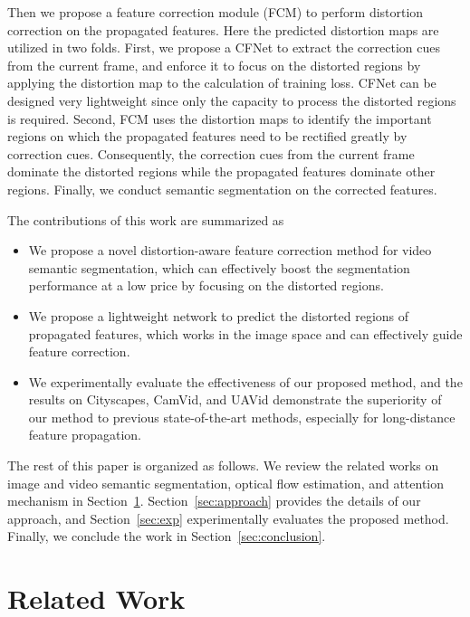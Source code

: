 \documentclass[journal]{IEEEtran}
\begin{document}
Then we propose a feature correction module (FCM) to perform distortion correction on the propagated features. Here the predicted distortion maps are utilized in two folds. First, we propose a CFNet to extract the correction cues from the current frame, and enforce it to focus on the distorted regions by applying the distortion map to the calculation of training loss. CFNet can be designed very lightweight since only the capacity to process the distorted regions is required. Second, FCM uses the distortion maps to identify the important regions on which the propagated features need to be rectified greatly by correction cues. Consequently, the correction cues from the current frame dominate the distorted regions while the propagated features dominate other regions. Finally, we conduct semantic segmentation on the corrected features. 


The contributions of this work are summarized as 
\begin{itemize}
	\item We propose a novel distortion-aware feature correction method for video semantic segmentation, which can effectively boost the segmentation performance at a low price by focusing on the distorted regions. 
	\item We propose a lightweight network to predict the distorted regions of propagated features, which works in the image space and can effectively guide feature correction. 
	\item We experimentally evaluate the effectiveness of our proposed method, and the results on Cityscapes, CamVid, and UAVid demonstrate the superiority of our method to previous state-of-the-art methods, especially for long-distance feature propagation.
\end{itemize}

The rest of this paper is organized as follows. We review the related works on image and video semantic segmentation, optical flow estimation, and attention mechanism in Section~\ref{sec:related}. Section~\ref{sec:approach} provides the details of our approach, and Section~\ref{sec:exp} experimentally evaluates the proposed method. Finally, we conclude the work in Section~\ref{sec:conclusion}.



\section{Related Work} \label{sec:related}
\end{document}
